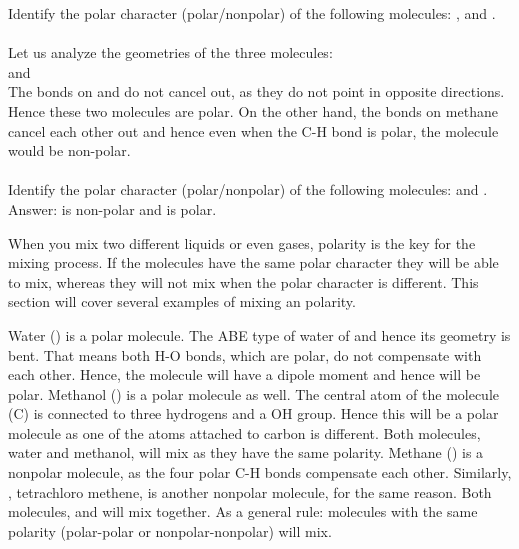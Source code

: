 \documentclass[main.tex]{subfiles}
\begin{document}
\begin{description}
\begin{example} %
Identify the polar character (polar/nonpolar) of the following molecules: ,  and .\\
\\
Let us analyze the geometries of the three molecules:\\
\hspace{.05in}\hspace{.05in}\hspace{.05in}\hspace{.05in} and \hspace{.05in}\hspace{.05in}
\\
The bonds on  and  do not cancel out, as they do not point in opposite directions. Hence these two molecules are polar. On the other hand, the bonds on methane cancel each other out and hence even when the C-H bond is polar, the molecule would be non-polar.\\
\faDiamond\ \\
Identify the polar character (polar/nonpolar) of the following molecules:  and .\\
\flushright Answer:  is non-polar and  is polar.
\end{example}%


\item[\docfilehook{Polarity and mixing}{Polarity and mixing}] 
When you mix two different liquids or even gases, polarity is the key for the mixing process. If the molecules have the same polar character they will be able to mix, whereas they will not mix when the polar character is different. This section will cover several examples of mixing an polarity.

\item[\docfilehook{Molecules with the same polarity}{Molecules with the same polarity}] Water () is a polar molecule. The ABE type of water of  and hence its geometry is bent. That means both H-O bonds, which are polar, do not compensate with each other. Hence, the molecule will have a dipole moment and hence will be polar. Methanol () is a polar molecule as well. The central atom of the molecule (C) is connected to three hydrogens and a OH group. Hence this will be a polar molecule as one of the atoms attached to carbon is different. Both molecules, water and methanol, will mix as they have the same polarity. Methane () is a nonpolar molecule, as the four polar C-H bonds compensate each other. Similarly, , tetrachloro methene, is another nonpolar molecule, for the same reason. Both molecules,  and  will mix together. As a general rule: molecules with the same polarity (polar-polar or nonpolar-nonpolar) will mix.


\end{description}
\end{document}
